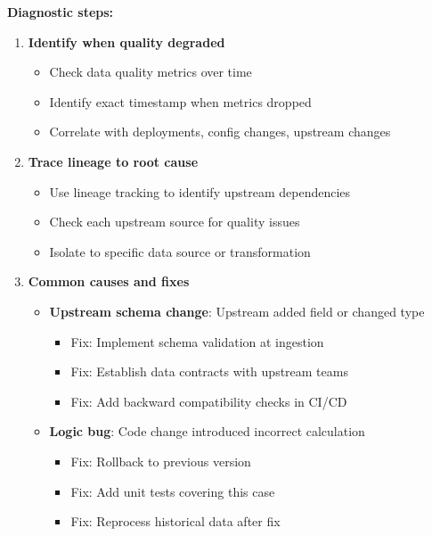 \textbf{Diagnostic steps:}
\begin{enumerate}
    \item \textbf{Identify when quality degraded}
        \begin{itemize}
            \item Check data quality metrics over time
            \item Identify exact timestamp when metrics dropped
            \item Correlate with deployments, config changes, upstream changes
        \end{itemize}

    \item \textbf{Trace lineage to root cause}
        \begin{itemize}
            \item Use lineage tracking to identify upstream dependencies
            \item Check each upstream source for quality issues
            \item Isolate to specific data source or transformation
        \end{itemize}

    \item \textbf{Common causes and fixes}
        \begin{itemize}
            \item \textbf{Upstream schema change}: Upstream added field or changed type
                \begin{itemize}
                    \item Fix: Implement schema validation at ingestion
                    \item Fix: Establish data contracts with upstream teams
                    \item Fix: Add backward compatibility checks in CI/CD
                \end{itemize}

            \item \textbf{Logic bug}: Code change introduced incorrect calculation
                \begin{itemize}
                    \item Fix: Rollback to previous version
                    \item Fix: Add unit tests covering this case
                    \item Fix: Reprocess historical data after fix
                \end{itemize}


\end{itemize}
\end{enumerate}
